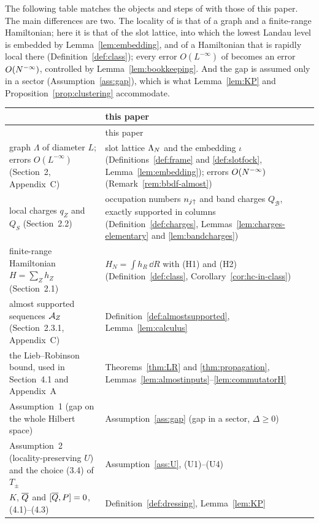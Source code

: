 The following table matches the objects and steps of \cite{BBDF21} with those of this paper. The main differences are
two. The locality of \cite{BBDF21} is that of a graph and a finite-range Hamiltonian; here it is that of the slot
lattice, into which the lowest Landau level is embedded by Lemma~\ref{lem:embedding}, and of a Hamiltonian that is
rapidly local there (Definition~\ref{def:class}); every error $O(L^{-\infty})$ of \cite{BBDF21} becomes an error $O(N^{-\infty})$,
controlled by Lemma~\ref{lem:bookkeeping}. And the gap is assumed only in a sector (Assumption~\ref{ass:gap}), which is
what Lemma~\ref{lem:KP} and Proposition~\ref{prop:clustering} accommodate.

\begingroup\small
\begin{longtable}{@{}p{}p{}@{}}
\toprule
\cite{BBDF21} & this paper\\
\midrule
\endfirsthead
\toprule
\cite{BBDF21} & this paper\\
\midrule
\endhead
\bottomrule
\endfoot
graph $\Lambda$ of diameter $L$; errors $O(L^{-\infty})$ (Section~2, Appendix~C) & slot lattice $\Lambda_N$ and the
embedding $\iota$ (Definitions~\ref{def:frame} and \ref{def:slotfock}, Lemma~\ref{lem:embedding}); errors $O(N^{-\infty})$
(Remark~\ref{rem:bbdf-almost})\\
local charges $q_Z$ and $Q_S$ (Section~2.2) & occupation numbers $n_{j{\uparrow}}$ and band charges $Q_{\mathcal B}$, exactly
supported in columns (Definition~\ref{def:charges}, Lemmas~\ref{lem:charges-elementary} and \ref{lem:bandcharges})\\
finite-range Hamiltonian $H=\sum_Zh_Z$ (Section~2.1) & $H_N=\int h_R\,\dd R$ with (H1) and (H2)
(Definition~\ref{def:class}, Corollary~\ref{cor:hc-in-class})\\
almost supported sequences $\mathcal{A}_Z$ (Section~2.3.1, Appendix~C) & Definition~\ref{def:almostsupported},
Lemma~\ref{lem:calculus}\\
the Lieb--Robinson bound, used in Section~4.1 and Appendix~A & Theorems~\ref{thm:LR} and \ref{thm:propagation},
Lemmas~\ref{lem:almostinputs}--\ref{lem:commutatorH}\\
Assumption~1 (gap on the whole Hilbert space) & Assumption~\ref{ass:gap} (gap in a sector, $\Delta\ge0$)\\
Assumption~2 (locality-preserving $U$) and the choice (3.4) of $T_\pm$ & Assumption~\ref{ass:U}, (U1)--(U4)\\
$K$, $\overline{Q}$ and $[\overline{Q},P]=0$, (4.1)--(4.3) & Definition~\ref{def:dressing}, Lemma~\ref{lem:KP}\\

\end{longtable}
